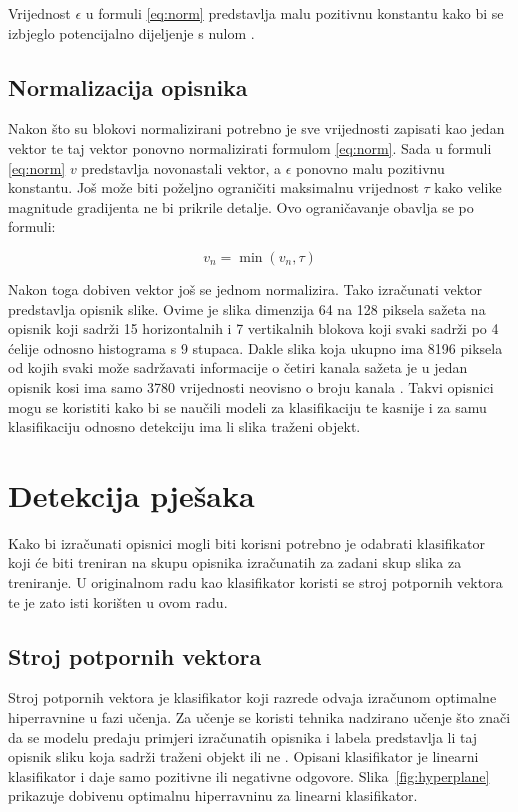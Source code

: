 \documentclass[times, utf8, zavrsni]{fer}
\begin{document}
Vrijednost $\epsilon$ u formuli \ref{eq:norm} predstavlja malu pozitivnu konstantu kako bi se izbjeglo potencijalno dijeljenje s nulom \citep{tomasi2012histograms}.

\section{Normalizacija opisnika}
Nakon što su blokovi normalizirani potrebno je sve vrijednosti zapisati kao jedan vektor te taj vektor ponovno normalizirati formulom \ref{eq:norm}. Sada u formuli \ref{eq:norm} \(v\) predstavlja novonastali vektor, a $\epsilon$ ponovno malu pozitivnu konstantu. Još može biti poželjno ograničiti maksimalnu vrijednost $\tau$ kako velike magnitude gradijenta ne bi prikrile detalje. Ovo ograničavanje obavlja se po formuli:

\begin{equation}
	v_n = \min(v_n, \tau)
	\label{eq:limit}
\end{equation}

Nakon toga dobiven vektor još se jednom normalizira. Tako izračunati vektor predstavlja opisnik slike. Ovime je slika dimenzija 64 na 128 piksela sažeta na opisnik koji sadrži 15 horizontalnih i 7 vertikalnih blokova koji svaki sadrži po 4 ćelije odnosno histograma s 9 stupaca. Dakle slika koja ukupno ima 8196 piksela od kojih svaki može sadržavati informacije o četiri kanala sažeta je u jedan opisnik kosi ima samo 3780 vrijednosti neovisno o broju kanala \citep{tomasi2012histograms}. Takvi opisnici mogu se koristiti kako bi se naučili modeli za klasifikaciju te kasnije i za samu klasifikaciju odnosno detekciju ima li slika traženi objekt.

\chapter{Detekcija pješaka}
Kako bi izračunati opisnici mogli biti korisni potrebno je odabrati klasifikator koji će biti treniran na skupu opisnika izračunatih za zadani skup slika za treniranje. U originalnom radu \cite{dalal2005histograms} kao klasifikator koristi se stroj potpornih vektora te je zato isti korišten u ovom radu.

\section{Stroj potpornih vektora}
Stroj potpornih vektora  je klasifikator koji razrede odvaja izračunom optimalne hiperravnine u fazi učenja. Za učenje se koristi tehnika nadzirano učenje što znači da se modelu predaju primjeri izračunatih opisnika i labela predstavlja li taj opisnik sliku koja sadrži traženi objekt ili ne \citep{svm}. Opisani klasifikator je linearni klasifikator i daje samo pozitivne ili negativne odgovore. Slika~\ref{fig:hyperplane} prikazuje dobivenu optimalnu hiperravninu za linearni klasifikator.
\end{document}
